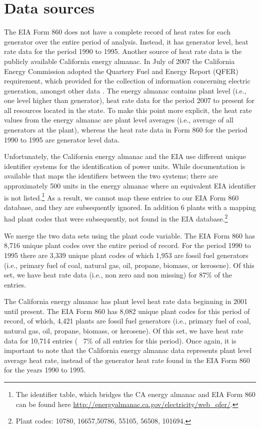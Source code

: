 \documentclass[10pt]{report}
\begin{document}
\section{Data sources}
The EIA Form 860 does not have a complete record of heat rates for each generator over the entire period of analysis. 
Instead, it has generator level, heat rate data for the period 1990 to 1995. 
Another source of heat rate data is the publicly available California energy almanac.
In July of 2007 the California Energy Commission adopted the Quartery Fuel and Energy Report (QFER) requirement, which provided for the collection of information concerning electric generation, amongst other data \parencite{cec2016}. 
The energy almanac contains plant level (i.e., one level higher than generator), heat rate data for the period 2007 to present for all resources located in the state.  
To make this point more explicit, the heat rate values from the energy almanac are plant level averages (i.e., average of all generators at the plant), whereas the heat rate data in Form 860 for the period 1990 to 1995 are generator level data.   

Unfortunately, the California energy almanac and the EIA use different unique identifier systems for the identification of power units. 
While documentation is available that maps the identifiers between the two systems; there are approximately 500 units in the energy almanac where an equivalent EIA identifier is not listed.\footnote{The identifier table, which bridges the CA energy almanac and EIA Form 860 can be found here \url{http://energyalmanac.ca.gov/electricity/web_qfer/}.} 
As a result, we cannot map these entries to our EIA Form 860 database, and they are subsequently ignored.
In addition 6 plants with a mapping had plant codes that were subsequently, not found in the EIA database.\footnote{Plant codes: 10780, 16657,50786, 55105, 56508, 101694.}

We merge the two data sets using the plant code variable. 
The EIA Form 860 has 8,716 unique plant codes over the entire period of record.
For the period 1990 to 1995 there are 3,339 unique plant codes of which 1,953 are fossil fuel generators (i.e., primary fuel of coal, natural gas, oil, propane, biomass, or kerosene).
Of this set, we have heat rate data (i.e., non zero and non missing) for 87\% of the entries.

The California energy almanac has plant level heat rate data beginning in 2001 until present.
The EIA Form 860 has 8,082 unique plant codes for this period of record, of which, 4,421 plants are fossil fuel generators (i.e., primary fuel of coal, natural gas, oil, propane, biomass, or kerosene).
Of this set, we have heat rate data for 10,714 entries (~ 7\% of all entries for this period). 
Once again, it is important to note that the California energy almanac data represents plant level average heat rate, instead of the generator heat rate found in the EIA Form 860 for the years 1990 to 1995. 
\end{document}
